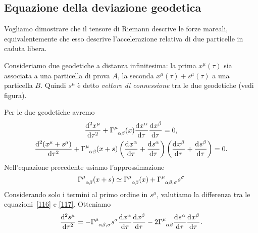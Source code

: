 \subsection{Equazione della deviazione geodetica}
\label{sec:deviazione-geodetica}

Vogliamo dimostrare che il tensore di Riemann descrive le forze mareali,
equivalentemente che esso descrive l'accelerazione relativa di due particelle in
caduta libera.

Consideriamo due geodetiche a distanza infinitesima: la prima $x^{\mu}(\tau)$
sia associata a una particella di prova $A$, la seconda $x^{\mu}(\tau)
+s^{\mu}(\tau)$ a una particella $B$.  Quindi $s^{\mu}$ è detto \emph{vettore di
  connessione} tra le due geodetiche (vedi figura).

Per le due geodetiche avremo
\begin{subequations}
  \begin{gather}
    \toder[2]{x^{\mu}}{\tau} + \tensor{\Gamma}{^{\mu}_{\alpha \beta}}(x)
    \toder{x^{\alpha}}{\tau} \toder{x^{\beta}}{\tau} = 0,
    \label{116} \\
    \toder[2]{(x^{\mu}+ s^{\mu})}{\tau} + \tensor{\Gamma}{^{\mu}_{\alpha
        \beta}}(x+s) \left(\toder{x^{\alpha}}{\tau} + \toder{s^{\alpha}}{\tau}
    \right) \left( \toder{x^{\beta}}{\tau} + \toder{s^{\beta}}{\tau} \right) =
    0.
    \label{117}
  \end{gather}
\end{subequations}
Nell'equazione precedente usiamo l'approssimazione
\begin{equation}
  \tensor{\Gamma}{^{\mu}_{\alpha \beta}}(x+s) \simeq
  \tensor{\Gamma}{^{\mu}_{\alpha \beta}}(x) + \tensor{\Gamma}{^{\mu}_{\alpha
      \beta ,\sigma}} s^{\sigma}
\end{equation}
Considerando solo i termini al primo ordine in $s^{\mu}$, valutiamo la
differenza tra le equazioni~\eqref{116} e \eqref{117}.  Otteniamo
\begin{equation}
  \toder[2]{s^{\mu}}{\tau} =
  -\tensor{\Gamma}{^{\mu}_{\alpha \beta, \sigma}} s^{\sigma}
  \toder{x^{\alpha}}{\tau} \toder{x^{\beta}}{\tau}
  -2\tensor{\Gamma}{^{\mu}_{\alpha \beta}} \toder{s^{\alpha}}{\tau}
  \toder{x^{\beta}}{\tau}.
  \label{119}
\end{equation}


